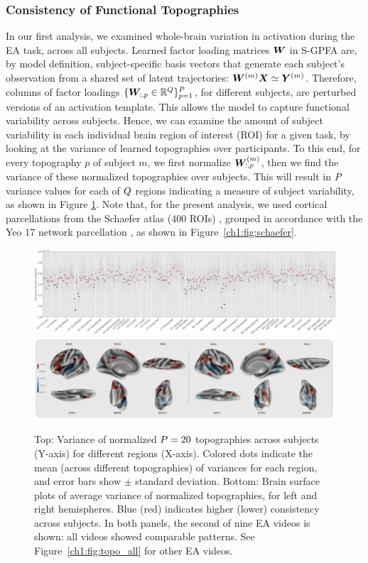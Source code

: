 \subsubsection{Consistency of Functional Topographies}
\label{ch1:subsec:topo_consistency}
In our first analysis, we examined whole-brain variation in activation during the EA task, across all subjects. Learned factor loading matrices $\bm{W}$ in S-GPFA are, by model definition, subject-specific basis vectors that generate each subject's observation from a shared set of latent trajectories: $\bm{W}^{(m)}\bm{X} \simeq \bm{Y}^{(m)}$. Therefore, columns of factor loadings $\{\bm{W}_{:,p} \in \mathbb{R}^Q\}_{p=1}^{P}$, for different subjects, are perturbed versions of an activation template. This allows the model to capture functional variability across subjects. Hence, we can examine the amount of subject variability in each individual brain region of interest (ROI) for a given task, by looking at the variance of learned topographies over participants. To this end, for every topography $p$ of subject $m$, we first normalize $\bm{W}^{(m)}_{:,p}$, then we find the variance of these normalized topographies over subjects. This will result in $P$ variance values for each of $Q$ regions indicating a measure of subject variability, as shown in Figure  \ref{ch1:fig:topo}. Note that, for the present analysis, we used cortical parcellations from the Schaefer atlas (400 ROIs) \cite{schaefer2018local}, grouped in accordance with the Yeo 17 network parcellation \cite{yeo}, as shown in Figure~\ref{ch1:fig:schaefer}. 

\begin{figure}[h!]
    \centering
    \includegraphics[width=\linewidth]{figs/ch1/topo_cons_scatter.png}
    \includegraphics[width=\linewidth]{figs/ch1/topo1_brain.pdf}
    \caption{Top: Variance of normalized $P=20$ topographies across subjects (Y-axis) for different regions (X-axis). Colored dots indicate the mean (across different topographies) of variances for each region, and error bars show $\pm$ standard deviation. Bottom: Brain surface plots of average variance of normalized topographies, for left and right hemispheres. Blue (red) indicates higher (lower) consistency across subjects. In both panels, the second of nine EA videos is shown: all videos showed comparable patterns. See Figure~\ref{ch1:fig:topo_all} for other EA videos.}
    \label{ch1:fig:topo}
\end{figure}

